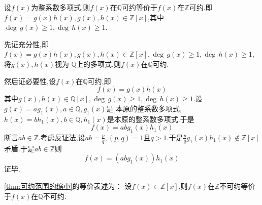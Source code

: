 \begin{formal}
\begin{theorem}[可约范围的缩小]\label{thm:可约范围的缩小}
    设$f\left(x\right)$为整系数多项式,则$f\left(x\right)$在$\mathbb{Q}$可约等价于$f\left(x\right)$在$\mathbb{Z}$可约.即$f\left(x\right)=g\left(x\right)
    h\left(x\right),g\left(x\right),h\left(x\right)\in\mathbb{Z}\left[x\right]$,其中$\deg\,g\left(x\right)\geqslant 1,\deg\,h\left(x\right)\geqslant 1.$
\end{theorem}
\begin{Proof}
先证充分性,即$f\left(x\right)=g\left(x\right)h\left(x\right),g\left(x\right),h\left(x\right)\in\mathbb{Z}\left[x\right],\deg \,g\left(x\right)\geqslant 1,
\deg\,h\left(x\right)\geqslant 1$,将$g\left(x\right),h\left(x\right)$视为
$\mathbb{Q}$上的多项式,则$f\left(x\right)$在$\mathbb{Q}$可约.

然后证必要性,设$f\left(x\right)$在$\mathbb{Q}$可约,即\[
f\left(x\right)=g\left(x\right)h\left(x\right)
\]
其中$g\left(x\right),h\left(x\right)\in\mathbb{Q}\left[x\right],\deg\,g\left(x\right)\geqslant 1,\deg\,h\left(x\right)\geqslant1.$设$g\left(x\right)=ag_1\left(x\right),a\in\mathbb{Q},g_1\left(x\right)$是
本原的整系数多项式,$h\left(x\right)=bh_1\left(x\right),b\in\mathbb{Q},h_1\left(x\right)$是本原的整系数多项式.于是
\[
f\left(x\right)=abg_1\left(x\right)h_1\left(x\right)
\]
断言$ab\in\mathbb{Z}$.考虑反证法,设$\displaystyle
ab=\frac{p}{q},\left(p,q\right)=1$且$q>1.$于是$\displaystyle
\frac{p}{q}g_1\left(x\right)h_1\left(x\right)\notin \mathbb{Z}\left[x\right]$矛盾.于是$ab\in\mathbb{Z}$则
\[
f\left(x\right)=\left(abg_1\left(x\right)\right)h_1\left(x\right)
\]
证毕.
\end{Proof}
\end{formal}
\begin{formal}
\begin{theorem}[等价表述]\label{thm:等价表述}
    \cref{thm:可约范围的缩小}的等价表述为：
    设$f\left(x\right)\in\mathbb{Z}\left[x\right]$,则$f\left(x\right)$在$\mathbb{Z}$不可约等价于$f\left(x\right)$在$\mathbb{Q}$不可约.
\end{theorem}
\end{formal}
